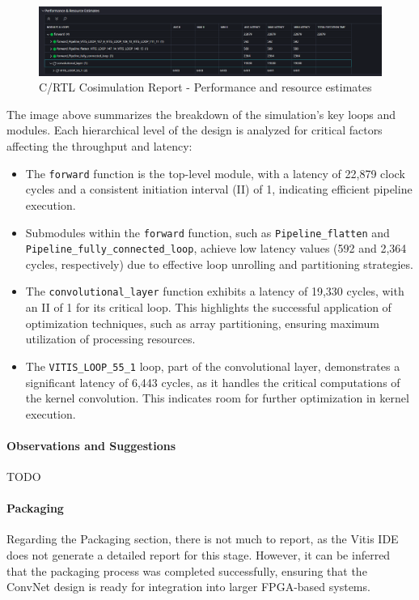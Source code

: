 \documentclass{article}
\begin{document}
\begin{figure}[H]
    \centering
    \includegraphics[width=1\textwidth]{./assets/ConvNet/c-rtl-cosimulation.png}
    \caption{C/RTL Cosimulation Report - Performance and resource estimates}
    \label{fig:C-RTL-cosimulation-convnet}
\end{figure}

The image above summarizes the breakdown of the simulation's key loops and modules. Each hierarchical level of the design is analyzed for critical factors affecting the throughput and latency:

\begin{itemize}
    \item The \texttt{forward} function is the top-level module, with a latency of 22,879 clock cycles and a consistent initiation interval (II) of 1, indicating efficient pipeline execution.
    \item Submodules within the \texttt{forward} function, such as \texttt{Pipeline\_flatten} and \texttt{Pipeline\_fully\_connected\_loop}, achieve low latency values (592 and 2,364 cycles, respectively) due to effective loop unrolling and partitioning strategies.
    \item The \texttt{convolutional\_layer} function exhibits a latency of 19,330 cycles, with an II of 1 for its critical loop. This highlights the successful application of optimization techniques, such as array partitioning, ensuring maximum utilization of processing resources.
    \item The \texttt{VITIS\_LOOP\_55\_1} loop, part of the convolutional layer, demonstrates a significant latency of 6,443 cycles, as it handles the critical computations of the kernel convolution. This indicates room for further optimization in kernel execution.
\end{itemize}


\paragraph{Observations and Suggestions}
TODO

\paragraph{Packaging}
Regarding the Packaging section, there is not much to report, as the Vitis IDE does not generate a detailed report for this stage. However, it can be inferred that the packaging process was completed successfully, ensuring that the ConvNet design is ready for integration into larger FPGA-based systems.
\end{document}
